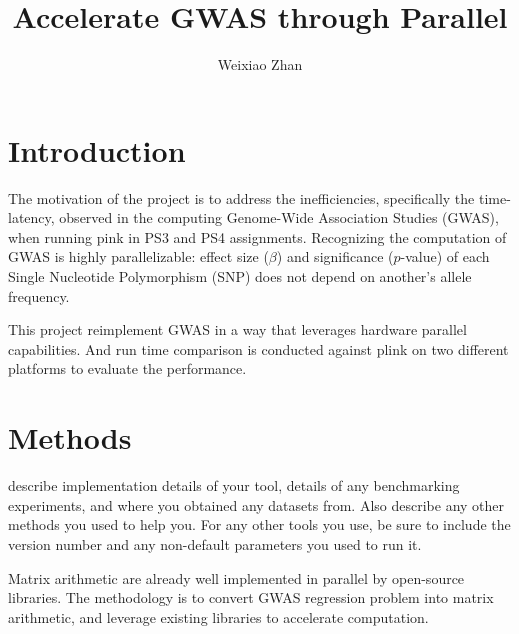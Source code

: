 \documentclass{article}
\title{Accelerate GWAS through Parallel}
\author{Weixiao Zhan}
\begin{document}
\maketitle

\section{Introduction}

The motivation of the project is to address the inefficiencies,
specifically the time-latency,
observed in the computing Genome-Wide Association Studies (GWAS), 
when running pink in PS3 and PS4 assignments.
Recognizing the computation of GWAS is highly 
parallelizable: effect size ($\beta$) and significance ($p$-value) of each 
Single Nucleotide Polymorphism (SNP) does not depend on another's allele frequency.

This project reimplement GWAS in a way that 
leverages hardware parallel capabilities.
And run time comparison is conducted against plink on two different platforms 
to evaluate the performance.

\section{Methods}
describe implementation details of your tool, details of any benchmarking experiments, and where you obtained any datasets from. Also describe any other methods you used to help you. For any other tools you use, be sure to include the version number and any non-default parameters you used to run it.

Matrix arithmetic are already well implemented in parallel by open-source libraries.
The methodology is to convert GWAS regression problem into matrix arithmetic,
and leverage existing libraries to accelerate computation.
\end{document}
